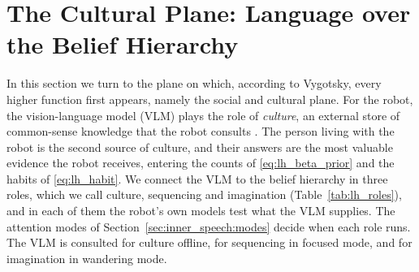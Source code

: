 %

\section{The Cultural Plane: Language over the Belief Hierarchy}
\label{sec:lang_hierarchy}

In this section we turn to the plane on which, according to Vygotsky, every higher function first appears, namely
the social and cultural plane. For the robot, the vision-language model (VLM) plays the role of \emph{culture}, an
external store of common-sense knowledge that the robot consults \cite{clark1998extended}. The
person living with the robot is the second source of culture, and their answers are the most valuable evidence the
robot receives, entering the counts of \eqref{eq:lh_beta_prior} and the habits of \eqref{eq:lh_habit}. We connect the
VLM to the belief hierarchy in three roles, which we call culture, sequencing and imagination
(Table~\ref{tab:lh_roles}), and in each of them the robot's own models test what the VLM supplies. The attention
modes of Section~\ref{sec:inner_speech:modes} decide when each role runs. The VLM is consulted for culture offline, for sequencing in focused mode, and for imagination in wandering mode.

